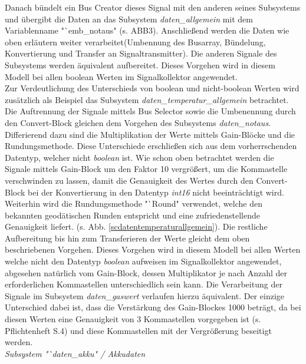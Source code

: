 \documentclass[fontsize = 12pt, paper = a4]{scrreprt}
\begin{document}
\newpage

Danach bündelt ein Bus Creator dieses Signal mit den anderen seines Subsystems und übergibt die Daten an das Subsystem \textit{daten\_allgemein} mit dem Variablenname "`emb\_notaus" (s. ABB3). Anschließend werden die Daten wie oben erläutern weiter verarbeitet(Umbennung des Busarray, Bündelung, Konvertierung und Transfer an Signaltransmitter). Die anderen Signale des Subsystems werden äquivalent aufbereitet. Dieses Vorgehen wird in diesem Modell bei allen boolean Werten im Signalkollektor angewendet. \\

Zur Verdeutlichung des Unterschieds von boolean und nicht-boolean Werten wird zusätzlich als Beispiel das Subsystem \textit{daten\_temperatur\_allgemein} betrachtet. Die Auftrennung der Signale mittels Bus Selector sowie die Umbenennung durch den Convert-Block gleichen dem Vorgehen des Subsystems \textit{daten\_notaus}. Differierend dazu sind die Multiplikation der Werte mittels Gain-Blöcke und die Rundungsmethode. Diese Unterschiede erschließen sich aus dem vorherrschenden Datentyp, welcher nicht \textit{boolean} ist. Wie schon oben betrachtet werden die Signale mittels Gain-Block um den Faktor 10 vergrößert, um die Kommastelle verschwinden zu lassen, damit die Genauigkeit des Wertes durch den Convert-Block bei der Konvertierung in den Datentyp \textit{int16} nicht beeinträchtigt wird. Weiterhin wird die Rundungsmethode "`Round" verwendet, welche den bekannten geodätischen Runden entspricht und eine zufriedenstellende Genauigkeit liefert. (s. Abb. \ref{scdatentemperaturallgemein}). Die restliche Aufbereitung bis hin zum Transferieren der Werte gleicht dem oben beschriebenen Vorgehen. Dieses Vorgehen wird in diesem Modell bei allen Werten welche nicht den Datentyp \textit{boolean} aufweisen im Signalkollektor angewendet, abgesehen natürlich vom Gain-Block, dessen Multiplikator je nach Anzahl der erforderlichen Kommastellen unterschiedlich sein kann. Die Verarbeitung der Signale im Subsystem \textit{daten\_gaswert} verlaufen hierzu äquivalent. Der einzige Unterschied dabei ist, dass die Verstärkung des Gain-Blockes 1000 beträgt, da bei diesen Werten eine Genauigkeit von 3 Kommastellen vorgegeben ist (s. Pflichtenheft S.4) und diese Kommastellen mit der Vergrößerung beseitigt werden. \\



\textit{Subsystem "`daten\_akku" / Akkudaten} \\
\end{document}
